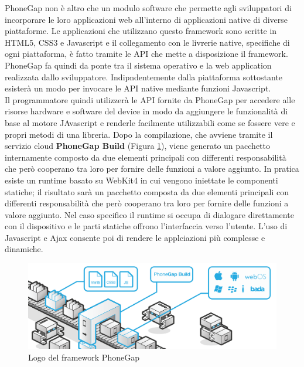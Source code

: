 \newpage
PhoneGap non è altro che un modulo software che permette agli sviluppatori di incorporare le loro applicazioni web all'interno di applicazioni native di diverse piattaforme. Le applicazioni che utilizzano questo framework sono scritte in HTML5, CSS3 e Javascript e il collegamento con le livrerie native, specifiche di ogni piattaforma, è fatto tramite le API che mette a disposizione il framework.
PhoneGap fa quindi da ponte tra il sistema operativo e la web application realizzata dallo sviluppatore. Indipndentemente dalla piattaforma sottostante esisterà un modo per invocare le API native mediante funzioni Javascript. \\
Il programmatore quindi utilizzerà le API fornite da PhoneGap per accedere alle risorse hardware e software del device in modo da aggiungere le funzionalità di base al motore JAvascript e renderle facilmente utilizzabili come se fossere vere e propri metodi di una libreria. Dopo la compilazione, che avviene tramite il servizio cloud \textbf{PhoneGap Build} (Figura \ref{fig:phonegap_build}), viene generato un pacchetto internamente composto da due elementi principali con differenti responsabilità che però cooperano tra loro per fornire delle funzioni a valore aggiunto. In pratica esiste un runtime basato su WebKit4 in cui vengono iniettate le componenti statiche; il risultato sarà un pacchetto composta da due elementi principali con differenti responsabilità che però cooperano tra loro per fornire delle funzioni a valore aggiunto. Nel caso specifico il runtime si occupa di dialogare direttamente con il dispositivo e le parti statiche offrono l'interfaccia verso l'utente. L'uso di Javascript e Ajax consente poi di rendere le applciazioni più complesse e dinamiche.
\begin{figure}[H]
	\centering
	\includegraphics[scale=0.3]{Implementazione/phonegap_build.png}
	\caption{Logo del framework PhoneGap}
	\label{fig:phonegap_build}
\end{figure}

